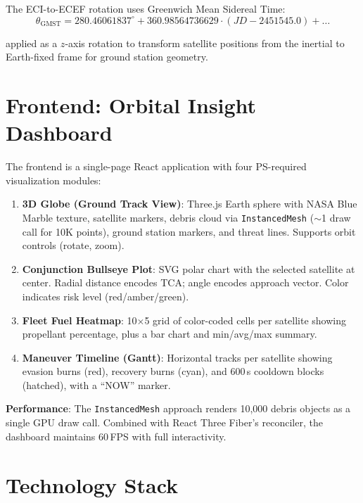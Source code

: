 \documentclass[11pt, a4paper]{article}
\begin{document}
The ECI-to-ECEF rotation uses Greenwich Mean Sidereal Time:
\begin{equation}
  \theta_\text{GMST} = 280.46061837^\circ + 360.98564736629 \cdot (JD - 2451545.0) + \ldots
\end{equation}

applied as a $z$-axis rotation to transform satellite positions from the inertial to Earth-fixed frame for ground station geometry.

\section{Frontend: Orbital Insight Dashboard}

The frontend is a single-page React application with four PS-required visualization modules:

\begin{enumerate}[nosep]
  \item \textbf{3D Globe (Ground Track View)}: Three.js Earth sphere with NASA Blue Marble texture, satellite markers, debris cloud via \texttt{InstancedMesh} ($\sim$1 draw call for 10K points), ground station markers, and threat lines. Supports orbit controls (rotate, zoom).

  \item \textbf{Conjunction Bullseye Plot}: SVG polar chart with the selected satellite at center. Radial distance encodes TCA; angle encodes approach vector. Color indicates risk level (red/amber/green).

  \item \textbf{Fleet Fuel Heatmap}: 10$\times$5 grid of color-coded cells per satellite showing propellant percentage, plus a bar chart and min/avg/max summary.

  \item \textbf{Maneuver Timeline (Gantt)}: Horizontal tracks per satellite showing evasion burns (red), recovery burns (cyan), and 600\,s cooldown blocks (hatched), with a ``NOW'' marker.
\end{enumerate}

\textbf{Performance}: The \texttt{InstancedMesh} approach renders 10{,}000 debris objects as a single GPU draw call. Combined with React Three Fiber's reconciler, the dashboard maintains 60\,FPS with full interactivity.

\section{Technology Stack}
\end{document}
